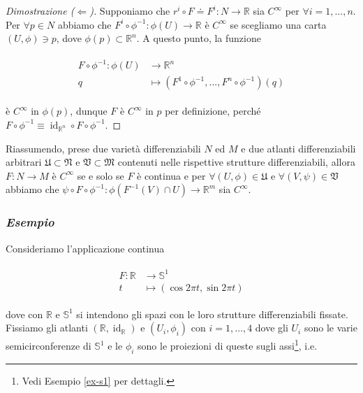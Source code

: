 \begin{proof}[Dimostrazione ($ \Longleftarrow $)]
	Supponiamo che $ r^{i} \circ F \doteq F^{i} : N \to \mathbb{R} $ sia $ C^{\infty} $ per $ \forall i=1,\dots,n $. Per $ \forall p \in N $ abbiamo che $ F^{i} \circ \phi^{-1} : \phi(U) \to \mathbb{R} $ è $ C^{\infty} $ se scegliamo una carta $ (U,\phi) \ni p $, dove $ \phi(p) \subset \mathbb{R}^{n} $. A questo punto, la funzione
	
	\begin{align}
		\begin{split}
			F \circ \phi^{-1} : \phi(U) &\to \mathbb{R}^{n}\\
			q &\mapsto (F^{1} \circ \phi^{-1},\dots,F^{n} \circ \phi^{-1})(q)
		\end{split}
	\end{align}

	è $ C^{\infty} $ in $ \phi(p) $, dunque $ F $ è $ C^{\infty} $ in $ p $ per definizione, perché $ F \circ \phi^{-1} \equiv \operatorname{id}_{\mathbb{R}^{n}} \circ F \circ \phi^{-1} $.
\end{proof}

Riassumendo, prese due varietà differenziabili $ N $ ed $ M $ e due atlanti differenziabili arbitrari $ \mathfrak{U} \subset \mathfrak{N} $ e $ \mathfrak{V} \subset \mathfrak{M} $ contenuti nelle rispettive strutture differenziabili, allora $ F : N \to M $ è $ C^{\infty} $ se e solo se $ F $ è continua e per $ \forall (U,\phi) \in \mathfrak{U} $ e $ \forall (V,\psi) \in \mathfrak{V} $ abbiamo che $ \psi \circ F \circ \phi^{-1} : \phi(F^{-1}(V) \cap U) \to \mathbb{R}^{m} $ sia $ C^{\infty} $.

\subsubsection{\textit{Esempio}}

Consideriamo l'applicazione continua

\begin{align}
	\begin{split}
		F  : \mathbb{R} &\to \mathbb{S}^{1}\\
		t &\mapsto (\cos 2 \pi t, \sin 2 \pi t)
	\end{split}
\end{align}

dove con $ \mathbb{R} $ e $ \mathbb{S}^{1} $ si intendono gli spazi con le loro strutture differenziabili fissate.\\
Fissiamo gli atlanti $ (\mathbb{R},\operatorname{id}_{\mathbb{R}}) $ e $ (U_{i},\phi_{i}) $ con $ i=1,\dots,4 $ dove gli $ U_{i} $ sono le varie semicirconferenze di $ \mathbb{S}^{1} $ e le $ \phi_{i} $ sono le proiezioni di queste sugli assi\footnote{%
	Vedi Esempio \ref{ex-s1} per dettagli.%
}, i.e.

